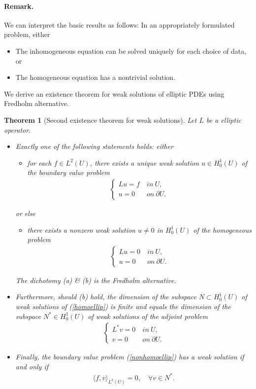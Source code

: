 \documentclass{article}
\numberwithin{equation}{section}
\theoremstyle{plain}
\newtheorem{theorem}{Theorem}[section]
\theoremstyle{definition}
\begin{document}
\paragraph{Remark.} We can interpret the basic results as follows: In an appropriately formulated problem, either
\begin{itemize}
\item[(a)] The inhomogeneous equation can be solved uniquely for each choice of data, or
\item[(b)] The homogeneous equation has a nontrivial solution.
\end{itemize}
We derive an existence theorem for weak solutions of elliptic PDEs using Fredholm alternative.
\begin{theorem}[Second existence theorem for weak solutions]\label{ellipex2}
Let $L$ be a elliptic operator.
\begin{itemize}
\item[(i)] Exactly one of the following statements holds: either
\begin{itemize}
\item[(a)] for each $f\in L^2(U)$, there exists a unique weak solution $u\in H_0^1(U)$ of the boundary value problem
\begin{align}
\begin{cases}
Lu=f\ &in\ U,\\
u=0\ &on\ \partial U,
\end{cases}\label{nonhomoellip}
\end{align}
\end{itemize}
or else
\begin{itemize}
\item[(b)] there exists a nonzero weak solution $u\neq 0$ in $H_0^1(U)$ of the homogeneous problem
\begin{align}
	\begin{cases}
		Lu=0\ &in\ U,\\
		u=0\ &on\ \partial U.
	\end{cases}\label{homoellip}
\end{align}
\end{itemize}
The dichotomy (a) \& (b) is the Fredholm alternative.
\item[(ii)] Furthermore, should (b) hold, the dimension of the subspace $N\subset H_0^1(U)$ of weak solutions of (\ref{homoellip}) is finite and equals the dimension of the subspace $N^*\in H_0^1(U)$ of weak solutions of the adjoint problem
\begin{align}
	\begin{cases}
		L^*v=0\ &in\ U,\\
		v=0\ &on\ \partial U.
	\end{cases}\label{adjhomoellip}
\end{align}
\item[(iii)] Finally, the boundary value problem (\ref{nonhomoellip}) has a weak solution if and only if
\begin{align*}
	\langle f,v\rangle_{L^2(U)}=0,\quad\forall v\in N^*.
\end{align*}
\end{itemize}
\end{theorem}
\end{document}
